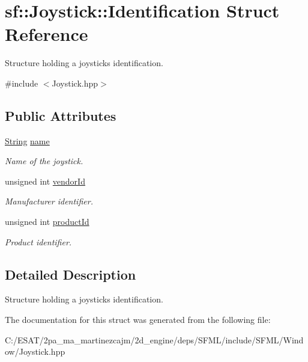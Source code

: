 \hypertarget{structsf_1_1_joystick_1_1_identification}{}\section{sf\+:\+:Joystick\+:\+:Identification Struct Reference}
\label{structsf_1_1_joystick_1_1_identification}


Structure holding a joystick\textquotesingle{}s identification.  




{\ttfamily \#include $<$Joystick.\+hpp$>$}

\subsection*{Public Attributes}
\begin{DoxyCompactItemize}
\item 
\mbox{\label{structsf_1_1_joystick_1_1_identification_a135a9a3a4dc11c2b5cde51159b4d136d}} 
\hyperlink{classsf_1_1_string}{String} \hyperlink{structsf_1_1_joystick_1_1_identification_a135a9a3a4dc11c2b5cde51159b4d136d}{name}
\begin{DoxyCompactList}\small\item\em Name of the joystick. \end{DoxyCompactList}\item 
\mbox{\label{structsf_1_1_joystick_1_1_identification_a827caf37a56492e3430e5ca6b15b5e9f}} 
unsigned int \hyperlink{structsf_1_1_joystick_1_1_identification_a827caf37a56492e3430e5ca6b15b5e9f}{vendor\+Id}
\begin{DoxyCompactList}\small\item\em Manufacturer identifier. \end{DoxyCompactList}\item 
\mbox{\label{structsf_1_1_joystick_1_1_identification_a18c21317789f51f9a5f132677727ff77}} 
unsigned int \hyperlink{structsf_1_1_joystick_1_1_identification_a18c21317789f51f9a5f132677727ff77}{product\+Id}
\begin{DoxyCompactList}\small\item\em Product identifier. \end{DoxyCompactList}\end{DoxyCompactItemize}


\subsection{Detailed Description}
Structure holding a joystick\textquotesingle{}s identification. 

The documentation for this struct was generated from the following file\+:\begin{DoxyCompactItemize}
\item 
C\+:/\+E\+S\+A\+T/2pa\+\_\+ma\+\_\+martinezcajm/2d\+\_\+engine/deps/\+S\+F\+M\+L/include/\+S\+F\+M\+L/\+Window/Joystick.\+hpp\end{DoxyCompactItemize}
